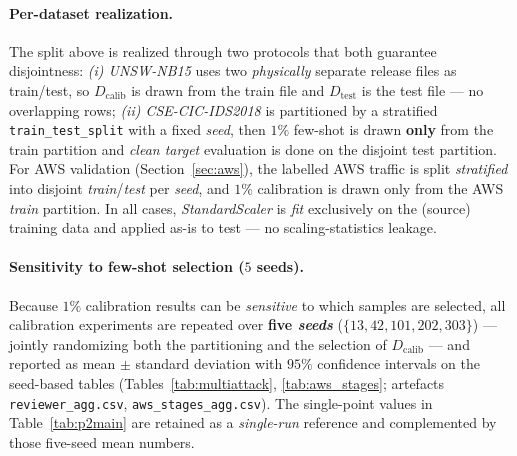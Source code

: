 \documentclass[preprint,12pt,authoryear]{elsarticle}
\begin{document}
\paragraph{Per-dataset realization.} The split above is realized through two
protocols that both guarantee disjointness: \emph{(i) UNSW-NB15} uses two
\emph{physically} separate release files as train/test, so $D_{\text{calib}}$ is
drawn from the train file and $D_{\text{test}}$ is the test file --- no overlapping
rows; \emph{(ii) CSE-CIC-IDS2018} is partitioned by a stratified
\texttt{train\_test\_split} with a fixed \emph{seed}, then $1\%$ few-shot is drawn
\textbf{only} from the train partition and \emph{clean target} evaluation is done on
the disjoint test partition. For AWS validation (Section~\ref{sec:aws}), the
labelled AWS traffic is split \emph{stratified} into disjoint \emph{train}/\emph{test}
per \emph{seed}, and $1\%$ calibration is drawn only from the AWS \emph{train}
partition. In all cases, \emph{StandardScaler} is \emph{fit} exclusively on the
(source) training data and applied as-is to test --- no scaling-statistics leakage.

\paragraph{Sensitivity to few-shot selection ($5$ seeds).} Because $1\%$
calibration results can be \emph{sensitive} to which samples are selected, all
calibration experiments are repeated over \textbf{five \emph{seeds}}
($\{13,42,101,202,303\}$) --- jointly randomizing both the partitioning and the
selection of $D_{\text{calib}}$ --- and reported as mean $\pm$ standard deviation
with $95\%$ confidence intervals on the seed-based tables
(Tables~\ref{tab:multiattack}, \ref{tab:aws_stages}; artefacts
\texttt{reviewer\_agg.csv}, \texttt{aws\_stages\_agg.csv}). The single-point values
in Table~\ref{tab:p2main} are retained as a \emph{single-run} reference and
complemented by those five-seed mean numbers.
\end{document}
